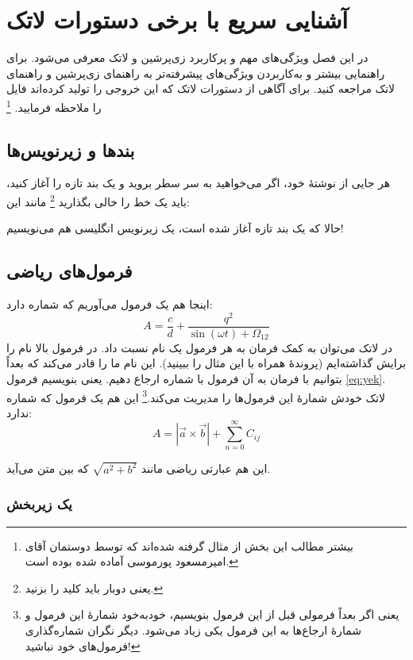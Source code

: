 \chapter{آشنایی سریع با برخی دستورات لاتک}\label{Chap:latexIntro}
\thispagestyle{empty}
در این فصل ویژگی‌های مهم و پرکاربرد زی‌پرشین و لاتک معرفی می‌شود. برای راهنمایی بیشتر و به‌کاربردن ویژگی‌های پیشرفته‌تر به راهنمای زی‌پرشین و راهنمای لاتک مراجعه کنید. برای آگاهی از دستورات لاتک که این خروجی را تولید کرده‌اند فایل  را ملاحظه فرمایید.
\footnote{بیشتر مطالب این بخش از مثال
گرفته شده‌اند که توسط دوستمان آقای امیرمسعود پورموسی آماده شده بوده است.}

\section{بندها و زیرنویس‌ها}
هر جایی از نوشتهٔ خود، اگر می‌خواهید به سر سطر بروید و یک بند تازه را آغاز کنید، باید یک خط را خالی بگذارید
\footnote{یعنی دوبار باید کلید  را بزنید.}
 مانند این:

حالا که یک بند تازه آغاز شده است، یک زیرنویس انگلیسی
 هم می‌نویسیم!
\section{فرمول‌های ریاضی}\label{formula}

اینجا هم یک فرمول می‌آوریم که شماره دارد:
\begin{equation}\label{eq:yek}
A=\frac{c}{d}+\frac{q^2}{\sin(\omega t)+\Omega_{12}}
\end{equation}
در لاتک می‌توان به کمک فرمان
به هر فرمول یک نام نسبت داد. در فرمول بالا نام  را برایش گذاشته‌ایم (پروندهٔ  همراه با این مثال را ببینید). این نام ما را قادر می‌کند که بعداً بتوانیم با فرمان
به آن فرمول با شماره ارجاع دهیم. یعنی بنویسیم فرمول \ref{eq:yek}.
لاتک خودش شمارهٔ این فرمول‌ها را مدیریت می‌کند.\footnote{یعنی اگر بعداً فرمولی قبل از این فرمول بنویسیم، خودبه‌خود شمارهٔ این فرمول و شمارهٔ ارجاع‌ها به این فرمول یکی زیاد می‌شود. دیگر نگران شماره‌گذاری فرمول‌های خود نباشید!} این هم یک فرمول که شماره ندارد:
$$A=|\vec{a}\times \vec{b}| + \sum_{n=0}^\infty C_{ij}$$

این هم عبارتی ریاضی مانند
$\sqrt{a^2+b^2}$
 که بین متن می‌آید.
\subsection{یک زیربخش}\label{zirbakhsh}

